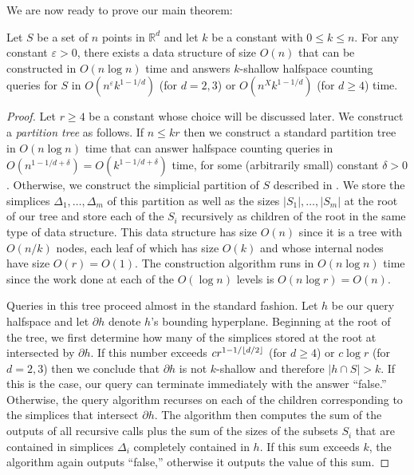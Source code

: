 \documentclass[lotsofwhite]{patmorin}
\newcommand{\eps}{\varepsilon}
\begin{document}
We are now ready to prove our main theorem:

\begin{thm}
Let $S$ be a set of $n$ points in $\mathbb{R}^d$ and let $k$ be a
constant with $0\le k\le n$.  For any constant $\eps>0$, there exists
a data structure of size $O(n)$ that can be constructed in $O(n\log
n)$ time and answers $k$-shallow halfspace
counting queries for $S$ in $O(n^\eps k^{1-1/d})$ (for $d=2,3$)
or $O(n^X k^{1-1/d})$ (for $d\ge 4$) time.
\end{thm}

\begin{proof}

Let $r\ge 4$ be a constant whose choice will be discussed later.  We
construct a \emph{partition tree} \cite{X} as follows.  If $n\le kr$
then we construct a standard partition tree in $O(n\log n)$ time that
can answer halfspace counting queries in
$O(n^{1-1/d+\delta})=O(k^{1-1/d+\delta})$ time, for some (arbitrarily
small) constant $\delta>0$.  Otherwise, we construct the simplicial
partition of $S$ described in .  We store
the simplices $\Delta_1,\ldots,\Delta_m$ of this partition as well as
the sizes $|S_1|,\ldots,|S_m|$ at the root of our tree and store each
of the $S_i$ recursively as children of the root in the same type of
data structure. This data structure has size $O(n)$ since it
is a tree with $O(n/k)$ nodes, each leaf of which has size $O(k)$ and
whose internal nodes have size $O(r)=O(1)$.  The construction
algorithm runs in $O(n\log n)$ time since the work done at each of the
$O(\log n)$ levels is $O(n\log r)=O(n)$. 

Queries in this tree proceed almost in the standard fashion. Let $h$
be our query halfspace and let $\partial h$ denote $h$'s bounding
hyperplane.  Beginning at the root of the tree, we first determine how
many of the simplices stored at the root at intersected by $\partial
h$.  If this number exceeds $cr^{1-1/\left\lfloor d/2 \right\rfloor}$ (for $d\ge 4$) or $c\log r$
(for $d=2,3$) then we conclude that $\partial h$ is not $k$-shallow
and therefore $|h\cap S|>k$.  If this is the case, our query can
terminate immediately with the answer ``false.''  Otherwise, the
query algorithm recurses on each of the children corresponding to the
simplices that intersect $\partial h$.  The algorithm then computes
the sum of the outputs of all recursive calls plus the sum of the
sizes of the subsets $S_i$ that are contained in simplices $\Delta_i$
completely contained in $h$.  If this sum exceeds $k$, the algorithm
again outputs ``false,'' otherwise it outputs the value of this sum.


\end{proof}
\end{document}
